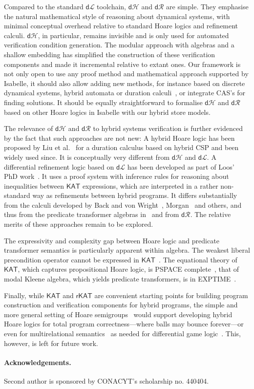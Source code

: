 \documentclass[envcountsame,envcountsect]{llncs}
\newcommand{\KAT}{\mathsf{KAT}}
\newcommand{\rKAT}{\mathsf{rKAT}}
\newcommand{\dL}{\mathsf{d}\mathcal{L}}
\newcommand{\dH}{\mathsf{d}\mathcal{H}}
\newcommand{\dR}{\mathsf{d}\mathcal{R}}
\begin{document}
Compared to the standard $\dL$ toolchain, $\dH$ and $\dR$ are
simple. They emphasise the natural mathematical style of reasoning
about dynamical systems, with minimal conceptual overhead relative to
standard Hoare logics and refinement calculi. $\dH$, in particular,
remains invisible and is only used for automated verification
condition generation. The modular approach with algebras and a shallow
embedding has simplified the construction of these verification
components and made it incremental relative to extant ones. Our
framework is not only open to use any proof method and mathematical
approach supported by Isabelle, it should also allow adding new
methods, for instance based on discrete dynamical systems, hybrid
automata or duration calculi~\cite{LiuLQZZZZ10}, or integrate CAS's
for finding solutions. It should be equally straightforward to
formalise $\dH$ and $\dR$ based on other Hoare logics in Isabelle with
our hybrid store models.

The relevance of $\dH$ and $\dR$ to hybrid systems verification is
further evidenced by the fact that such approaches are not new: A
hybrid Hoare logic has been proposed by Liu et al.~\cite{LiuLQZZZZ10}
for a duration calculus based on hybrid CSP and been widely used
since. It is conceptually very different from $\dH$ and $\dL$. A
differential refinement logic based on $\dL$ has been developed as
part of Loos' PhD work~\cite{LoosP16}.  It uses a proof system with
inference rules for reasoning about inequalities between $\KAT$
expressions, which are interpreted in a rather non-standard way as
refinements between hybrid programs. It differs substantially from the
calculi developed by Back and von Wright~\cite{BackW98},
Morgan~\cite{Morgan94} and others, and thus from the predicate
transformer algebras in~\cite{MuniveS19} and from $\dR$.  The relative
merits of these approaches remain to be explored.

The expressivity and complexity gap between Hoare logic and predicate
transformer semantics is particularly apparent within algebra. The
weakest liberal precondition operator cannot be expressed in
$\KAT$~\cite{Struth18}.  The equational theory of $\KAT$, which
captures propositional Hoare logic, is PSPACE
complete~\cite{KozenCS96}, that of modal Kleene algebra, which yields
predicate transformers, is in EXPTIME~\cite{MollerS06}.

Finally, while $\KAT$ and $\rKAT$ are convenient starting points for
building program construction and verification components for hybrid
programs, the simple and more general setting of Hoare
semigroups~\cite{Struth18} would support developing hybrid Hoare
logics for total program correctness---where balls may bounce
forever---or even for multirelational
semantics~\cite{FurusawaS16,FurusawaS15} as needed for differential
game logic~\cite{Platzer18}. This, however, is left for future work.

\paragraph{Acknowledgements.}
Second author is sponsored by CONACYT's scholarship no. 440404.








\end{document}
